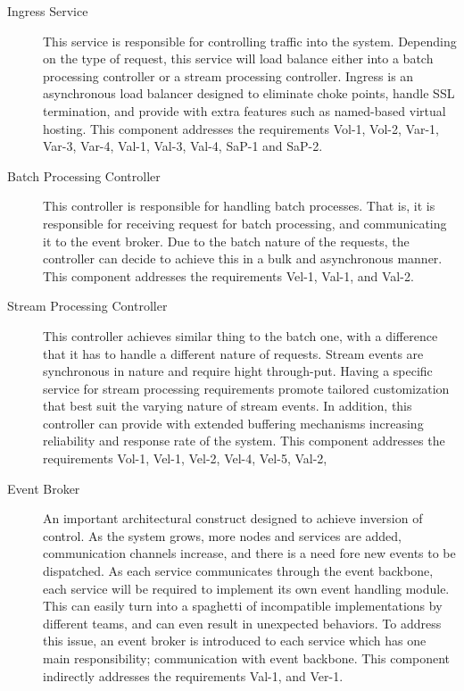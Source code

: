 \documentclass[a4paper,11pt]{article}
\begin{document}
\begin{description}
    \item[Ingress Service] This service is responsible for controlling traffic into the system. Depending on the type of request, this service will load balance either into a batch processing controller or a stream processing controller. Ingress is an asynchronous load balancer designed to eliminate choke points, handle SSL termination, and provide with extra features such as named-based virtual hosting. This component addresses the requirements Vol-1, Vol-2, Var-1, Var-3, Var-4, Val-1, Val-3, Val-4, SaP-1 and SaP-2. 
    
    \item[Batch Processing Controller] This controller is responsible for handling batch processes. That is, it is responsible for receiving request for batch processing, and communicating it to the event broker. Due to the batch nature of the requests, the controller can decide to achieve this in a bulk and asynchronous manner. This component addresses the requirements Vel-1, Val-1, and Val-2. 
    
    \item[Stream Processing Controller] This controller achieves similar thing to the batch one, with a difference that it has to handle a different nature of requests. Stream events are synchronous in nature and require hight through-put. Having a specific service for stream processing requirements promote tailored customization that best suit the varying nature of stream events. In addition, this controller can provide with extended buffering mechanisms increasing reliability and response rate of the system. This component addresses the requirements Vol-1, Vel-1, Vel-2, Vel-4, Vel-5, Val-2,  
    
    \item[Event Broker] An important architectural construct designed to achieve inversion of control. As the system grows, more nodes and services are added, communication channels increase, and there is a need fore new events to be dispatched. As each service communicates through the event backbone, each service will be required to implement its own event handling module. This can easily turn into a spaghetti of incompatible implementations by different teams, and can even result in unexpected behaviors. To address this issue, an event broker is introduced to each service which has one main responsibility; communication with event backbone. This component indirectly addresses the requirements Val-1, and Ver-1.  
    

\end{description}
\end{document}
